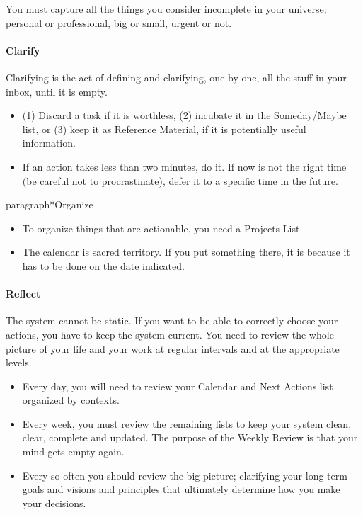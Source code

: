 You must capture all the things you consider incomplete in your universe; personal or professional, big or small, urgent or not.


\paragraph*{Clarify}
Clarifying is the act of
defining and clarifying, one by one, all the stuff in your inbox, until it is empty.

\begin{itemize}
\item
	(1) Discard a task if it is worthless, (2) incubate it in the Someday/Maybe list, or (3) keep it as Reference Material, if it is potentially useful information.

\item
	If an action takes less than two minutes, do it. If now is not the right time (be careful not to procrastinate), defer it to a specific time in the future.
\end{itemize}

paragraph*{Organize}
\begin{itemize}
\item
	To organize things that are actionable, you need a Projects List

\item
	The calendar is sacred territory. If you put something there, it is because it has to be done on the date indicated.
\end{itemize}

\paragraph*{Reflect}
The system cannot be static. If you want to be able to correctly choose your actions, you have to keep the system current. You need to
review the whole picture of your life and your work at regular intervals and at the appropriate levels.

\begin{itemize}
\item
	Every day, you will need to review your Calendar and Next Actions list organized by contexts.

\item
	Every week, you must review the remaining lists to keep your system clean, clear, complete and updated. The purpose of the Weekly
	Review is that your mind gets empty again.

\item
	Every so often you should review the big picture; clarifying your long-term goals and visions and principles that ultimately determine how you make your decisions.
\end{itemize}

